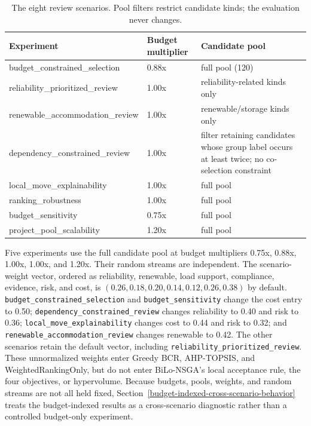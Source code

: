 \documentclass[applsci,article,submit,moreauthors]{Definitions/mdpi}
\begin{document}
\begin{table}[t]
\centering
\footnotesize
\setlength{\tabcolsep}{3pt}
\caption{The eight review scenarios. Pool filters restrict candidate kinds; the evaluation never changes.}\label{tab:2}
\begin{tabularx}{\textwidth}{@{}>{\raggedright\arraybackslash}X >{\raggedright\arraybackslash}X >{\raggedright\arraybackslash}X@{}}
\toprule
Experiment & Budget multiplier & Candidate pool \\
\midrule
budget\_constrained\_selection & 0.88x & full pool (120) \\
reliability\_prioritized\_review & 1.00x & reliability-related kinds only \\
renewable\_accommodation\_review & 1.00x & renewable/storage kinds only \\
dependency\_constrained\_review & 1.00x & filter retaining candidates whose group label occurs at least twice; no co-selection constraint \\
local\_move\_explainability & 1.00x & full pool \\
ranking\_robustness & 1.00x & full pool \\
budget\_sensitivity & 0.75x & full pool \\
project\_pool\_scalability & 1.20x & full pool \\
\bottomrule
\end{tabularx}
\end{table}

Five experiments use the full candidate pool at budget multipliers 0.75x, 0.88x, 1.00x, 1.00x, and 1.20x. Their random streams are independent. The scenario-weight vector, ordered as reliability, renewable, load support, compliance, evidence, risk, and cost, is \((0.26,0.18,0.20,0.14,0.12,0.26,0.38)\) by default. \texttt{budget\_constrained\_selection} and \texttt{budget\_sensitivity} change the cost entry to 0.50; \texttt{dependency\_constrained\_review} changes reliability to 0.40 and risk to 0.36; \texttt{local\_move\_explainability} changes cost to 0.44 and risk to 0.32; and \texttt{renewable\_accommodation\_review} changes renewable to 0.42. The other scenarios retain the default vector, including \texttt{reliability\_prioritized\_review}. These unnormalized weights enter Greedy BCR, AHP-TOPSIS, and WeightedRankingOnly, but do not enter BiLo-NSGA's local acceptance rule, the four objectives, or hypervolume. Because budgets, pools, weights, and random streams are not all held fixed, Section~\ref{budget-indexed-cross-scenario-behavior} treats the budget-indexed results as a cross-scenario diagnostic rather than a controlled budget-only experiment.
\end{document}
